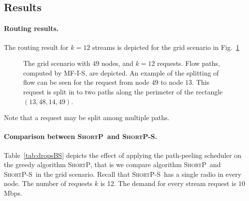 \documentclass[11pt]{article}
\newenvironment{proof sketch}[1]{\noindent {\emph{Proof sketch of #1:}}}{\hfill \qed}
\newcommand{\algA}{\textsc{MF-I-S}}
\newcommand{\algB}{\textsc{ShortP}}
\newcommand{\algBS}{\textsc{ShortP-S}}
\begin{document}
\subsection{Results}\label{app:res}
\paragraph{Routing results.}
The routing result for $k=12$ streams is depicted for the grid
scenario in Fig.~\ref{fig:scenario grid}

\begin{figure}[H]
  \centering {}
  \caption{The grid scenario with $49$ nodes, and $k=12$ requests.
    Flow paths, computed by \algA, are depicted.  An example of the
    splitting of flow can be seen for the request from node $49$ to
    node $13$. This request is split in to two paths along the
    perimeter of the rectangle $(13,48,14,49)$.}
  \label{fig:big6}\label{fig:scenario grid}
\end{figure}

Note that a request may be split among multiple paths.

\paragraph{Comparison between \algB\ and \algBS.}
Table~\ref{tab:dropsBS} depicts the effect of applying the
path-peeling scheduler on the greedy algorithm \algB, that is we
compare algorithm \algB\ and \algBS\ in the grid scenario.  Recall
that \algBS\ has a single radio in every node.  The number of requests
$k$ is 12. The demand for every stream request is $10$ Mbps.
\end{document}
